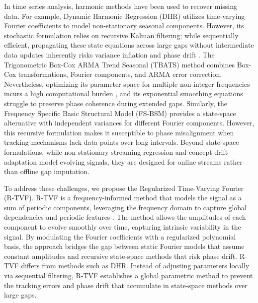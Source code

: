 \documentclass[a4paper,fleqn]{cas-sc}
\begin{document}
In time series analysis, harmonic methods have been used to recover missing data. For example, Dynamic Harmonic Regression (DHR) \cite{young1999dynamic} utilizes time-varying Fourier coefficients to model non-stationary seasonal components. However, its stochastic formulation relies on recursive Kalman filtering; while sequentially efficient, propagating these state equations across large gaps without intermediate data updates inherently risks variance inflation and phase drift \cite{young1999dynamic}. The Trigonometric Box-Cox ARMA Trend Seasonal (TBATS) method \cite{de2011forecasting} combines Box-Cox transformations, Fourier components, and ARMA error correction. Nevertheless, optimizing its parameter space for multiple non-integer frequencies incurs a high computational burden \cite{de2011forecasting}, and its exponential smoothing equations struggle to preserve phase coherence during extended gaps. Similarly, the Frequency Specific Basic Structural Model (FS-BSM) \cite{hindrayanto2013modelling} provides a state-space alternative with independent variances for different Fourier components. However, this recursive formulation makes it susceptible to phase misalignment when tracking mechanisms lack data points over long intervals. {\color{blue}Beyond state-space formulations, while non-stationary streaming regression and concept-drift adaptation \cite{yu2022continuous, li2024concept} model evolving signals, they are designed for online streams rather than offline gap imputation.}


To address these challenges, we propose {\color{blue}the} Regularized Time-Varying Fourier (R-TVF). R-TVF is a frequency-informed method \cite{mattera2025frequency,li2025novel} that models the signal as a sum of periodic components, leveraging the frequency domain to capture global dependencies and periodic features \cite{zhuang2024rethinking}. The method allows the amplitudes of each component to evolve smoothly over time, capturing intrinsic variability in the signal. By modulating the Fourier coefficients with a regularized polynomial basis, the approach bridges the gap between static Fourier models that assume constant amplitudes and recursive state-space methods that risk phase drift. R-TVF differs from methods such as DHR. Instead of adjusting parameters locally via sequential filtering, R-TVF establishes a global parametric method to prevent the tracking errors and phase drift that accumulate in state-space methods over large gaps.
\end{document}
